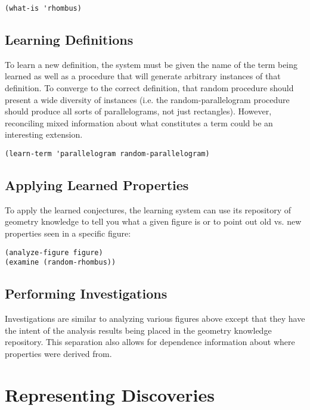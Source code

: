 \begin{verbatim}
(what-is 'rhombus)
\end{verbatim}

\subsection{Learning Definitions}

To learn a new definition, the system must be given the name of the
term being learned as well as a procedure that will generate arbitrary
instances of that definition. To converge to the correct definition,
that random procedure should present a wide diversity of instances
(i.e. the random-parallelogram procedure should produce all sorts of
parallelograms, not just rectangles). However, reconciling mixed
information about what constitutes a term could be an interesting
extension.

\begin{verbatim}
(learn-term 'parallelogram random-parallelogram)
\end{verbatim}

\subsection{Applying Learned Properties}

To apply the learned conjectures, the learning system can use its
repository of geometry knowledge to tell you what a given figure is or
to point out old vs. new properties seen in a specific figure:

\begin{verbatim}
(analyze-figure figure)
(examine (random-rhombus))
\end{verbatim}

\subsection{Performing Investigations}

Investigations are similar to analyzing various figures above except
that they have the intent of the analysis results being placed in the
geometry knowledge repository. This separation also allows for
dependence information about where properties were derived from.

\section{Representing Discoveries}

